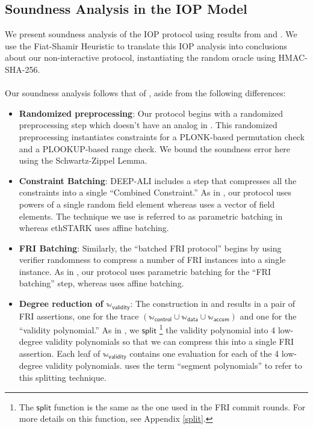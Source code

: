 \documentclass[10pt,letterpaper,titlepage]{article}
\theoremstyle{definition}
\begin{document}
\subsection{Soundness Analysis in the IOP Model}
\label{IOP soundness}
We present soundness analysis of the IOP protocol using results from \cite{proxGaps} and \cite{deepFRI}.
We use the Fiat-Shamir Heuristic to translate this IOP analysis into conclusions about our non-interactive protocol, instantiating the random oracle using HMAC-SHA-256.\\
\\
Our soundness analysis follows that of \cite{ethSTARK}, aside from the following differences:
\begin{itemize}
  \item \textbf{Randomized preprocessing}: Our protocol begins with a randomized preprocessing step which doesn't have an analog in \cite{ethSTARK}.
  This randomized preprocessing instantiates constraints for a PLONK-based permutation check and a PLOOKUP-based range check.
  We bound the soundness error here using the Schwartz-Zippel Lemma.
  \item \textbf{Constraint Batching}: DEEP-ALI includes a step that compresses all the constraints into a single ``Combined Constraint.''
  As in \cite{FRIsummary}, our protocol uses powers of a single random field element whereas \cite{ethSTARK} uses a vector of field elements.
  The technique we use is referred to as parametric batching in \cite{proxGaps} whereas ethSTARK uses affine batching.
  \item \textbf{FRI Batching}: Similarly, the ``batched FRI protocol'' begins by using verifier randomness to compress a number of FRI instances into a single instance. As in \cite{FRIsummary}, our protocol uses parametric batching for the ``FRI batching'' step, whereas \cite{ethSTARK} uses affine batching.
  \item \textbf{Degree reduction of $\mathbb{w}_\mathsf{validity}$}: The construction in \cite{stark} and \cite{ethSTARK} results in a pair of FRI assertions, one for the trace $(\mathbb{w}_\mathsf{control}\cup\mathbb{w}_\mathsf{data}\cup\mathbb{w}_\mathsf{accum})$ and one for the ``validity polynomial.'' As in \cite{FRIsummary}, we $\mathsf{split}$%
  \footnote{The $\mathsf{split}$ function is the same as the one used in the FRI commit rounds. For more details on this function, see Appendix \ref{split}.}
  the validity polynomial into 4 low-degree validity polynomials so that we can compress this into a single FRI assertion. Each leaf of $\mathbb{w}_\mathsf{validity}$ contains one evaluation for each of the 4 low-degree validity polynomials. \cite{FRIsummary} uses the term ``segment polynomials'' to refer to this splitting technique.
\end{itemize}
\end{document}
